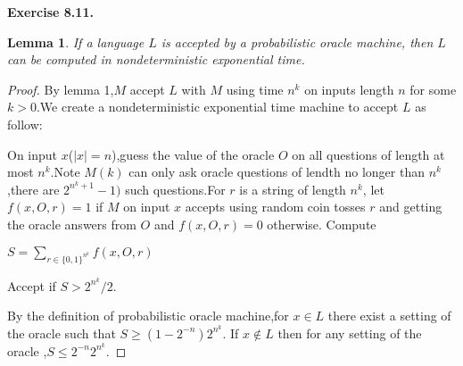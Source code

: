 \documentclass[a4paper]{article}
\newtheorem{lemma}{Lemma}
\newenvironment{exercise}[1]{
	\par
	\noindent\textbf{Exercise #1.}\quad
}{
	\par
	\bigskip
}
\begin{document}
\begin{exercise}{8.11}
		\begin{lemma}
			If a language $L$ is accepted by  a probabilistic oracle machine, then $L$ can be computed in nondeterministic exponential time.
		\end{lemma}

		\begin{proof}
			By lemma 1,$M$ accept $L$ with $M$ using time $n^k$ on inputs length $n$ for some $k>0$.We create a nondeterministic exponential time machine to accept $L$ as follow:
		
			On input $x$($|x|=n$),guess the value of the oracle $O$ on all questions of length at most $n^k$.Note $M(k)$ can only ask oracle questions of lendth no longer than $n^k$,there are $2^{n^k +1} -1)$ such questions.For $r$ is a string of length $n^k$, let $f(x,O,r)=1$ if $M$ on input $x$ accepts using random coin tosses $r$ and getting the oracle answers from $O$ and $f(x,O,r)=0$ otherwise. Compute
			
					$S= \sum_{r \in \{0,1\}^{n^k}}f(x,O,r)$

			Accept if $S>2^{n^k}/2$.
			
			By the definition of probabilistic oracle machine,for $x\in L$ there exist a setting of the oracle such that $S\ge(1-2^{-n})2^{n^k}$. If $x \notin L$ then for any setting of the oracle ,$S\leq 2^{-n}2^{n^k}$.
		\end{proof}
	\end{exercise}
\end{document}
